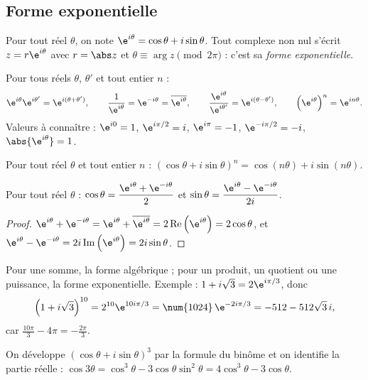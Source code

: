 \subsection{Forme exponentielle}
\begin{definition}
Pour tout réel $\theta$, on note $\e^{i\theta}=\cos\theta+i\sin\theta$. Tout complexe non nul s'écrit $z=r\e^{i\theta}$ avec $r=\abs z$ et $\theta\equiv\arg z\pmod{2\pi}$ : c'est sa \emph{forme exponentielle}.
\end{definition}
\begin{theorem}
Pour tous réels $\theta$, $\theta'$ et tout entier $n$ :
\[\e^{i\theta}\e^{i\theta'}=\e^{i(\theta+\theta')},\qquad\frac1{\e^{i\theta}}=\e^{-i\theta}=\overline{\e^{i\theta}},\qquad\frac{\e^{i\theta}}{\e^{i\theta'}}=\e^{i(\theta-\theta')},\qquad\left(\e^{i\theta}\right)^n=\e^{in\theta}.\]
Valeurs à connaître : $\e^{i0}=1$, $\e^{i\pi/2}=i$, $\e^{i\pi}=-1$, $\e^{-i\pi/2}=-i$, $\abs{\e^{i\theta}}=1$.
\end{theorem}
\begin{theorem}
Pour tout réel $\theta$ et tout entier $n$ : $(\cos\theta+i\sin\theta)^n=\cos(n\theta)+i\sin(n\theta)$.
\end{theorem}
\begin{theorem}
Pour tout réel $\theta$ : $\cos\theta=\dfrac{\e^{i\theta}+\e^{-i\theta}}2$ et $\sin\theta=\dfrac{\e^{i\theta}-\e^{-i\theta}}{2i}$.
\end{theorem}
\begin{proof}
$\e^{i\theta}+\e^{-i\theta}=\e^{i\theta}+\overline{\e^{i\theta}}=2\operatorname{Re}\left(\e^{i\theta}\right)=2\cos\theta$, et $\e^{i\theta}-\e^{-i\theta}=2i\operatorname{Im}\left(\e^{i\theta}\right)=2i\sin\theta$.
\end{proof}
\begin{method}
Pour une somme, la forme algébrique ; pour un produit, un quotient ou une puissance, la forme exponentielle. Exemple : $1+i\sqrt3=2\e^{i\pi/3}$, donc
\[\left(1+i\sqrt3\right)^{10}=2^{10}\e^{10i\pi/3}=\num{1024}\,\e^{-2i\pi/3}=-512-512\sqrt3\,i,\]
car $\frac{10\pi}3-4\pi=-\frac{2\pi}3$.
\end{method}
\begin{method}
On développe $(\cos\theta+i\sin\theta)^3$ par la formule du binôme et on identifie la partie réelle :
$\cos3\theta=\cos^3\theta-3\cos\theta\sin^2\theta=4\cos^3\theta-3\cos\theta$.
\end{method}
